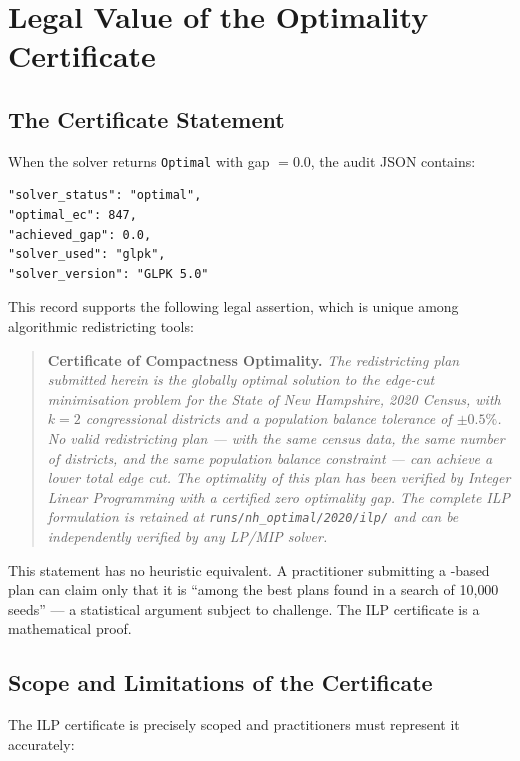 \section{Legal Value of the Optimality Certificate}
\label{sec:legal}

\subsection{The Certificate Statement}

When the \ilp{} solver returns \texttt{Optimal} with gap $= 0.0$, the
audit JSON contains:

\begin{verbatim}
"solver_status": "optimal",
"optimal_ec": 847,
"achieved_gap": 0.0,
"solver_used": "glpk",
"solver_version": "GLPK 5.0"
\end{verbatim}

This record supports the following legal assertion, which is unique among
algorithmic redistricting tools:

\begin{quote}
\textbf{Certificate of Compactness Optimality.}
\textit{The redistricting plan submitted herein is the globally optimal
solution to the edge-cut minimisation problem for the State of New Hampshire,
2020 Census, with $k = 2$ congressional districts and a population balance
tolerance of $\pm 0.5\%$.
No valid redistricting plan --- with the same census data, the same number
of districts, and the same population balance constraint --- can achieve a
lower total edge cut.
The optimality of this plan has been verified by Integer Linear Programming
with a certified zero optimality gap.
The complete ILP formulation is retained at \texttt{runs/nh\_optimal/2020/ilp/}
and can be independently verified by any LP/MIP solver.}
\end{quote}

This statement has no heuristic equivalent.
A practitioner submitting a \metis{}-based plan can claim only that it is
``among the best plans found in a search of 10{,}000 seeds'' --- a
statistical argument subject to challenge.
The ILP certificate is a mathematical proof.

\subsection{Scope and Limitations of the Certificate}

The ILP certificate is precisely scoped and practitioners must represent
it accurately:

